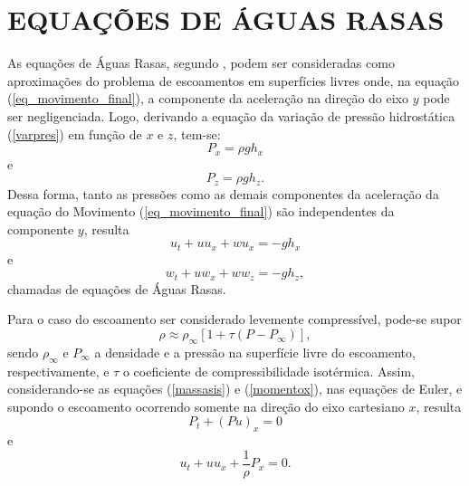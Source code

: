\section{EQUAÇÕES DE ÁGUAS RASAS} \label{aguasrasas}

As equações de Águas Rasas, segundo , podem ser consideradas como aproximações do problema de escoamentos em superfícies livres onde, na equação (\ref{eq_movimento_final}), a componente da aceleração na direção do eixo $y$ pode ser negligenciada. Logo, derivando a equação da variação de pressão hidrostática (\ref{varpres}) em função de $x$ e $z$, tem-se:
\begin{equation*} \label{P1}
P_x= \rho g h_x
\end{equation*}
e
\begin{equation*} \label{P2}
P_z= \rho g h_z.
\end{equation*}
Dessa forma, tanto as pressões como as demais componentes da aceleração da equação do Movimento (\ref{eq_movimento_final}) são independentes da componente $y$, resulta
\begin{equation} \label{AR}
u_t + uu_x + wu_x = -gh_x
\end{equation}
e
\begin{equation} \label{ARR}
w_t + uw_x + ww_z = -gh_z,
\end{equation}
chamadas de equações de Águas Rasas.

Para o caso do escoamento ser considerado levemente compressível, pode-se supor
\begin{equation*}
\rho \approx \rho_\infty \left[1+ \tau (P - P_\infty)\right],
\end{equation*}
sendo $\rho_\infty$ e $P_\infty$ a densidade e a pressão na superfície livre do escoamento, respectivamente, e $\tau$ o coeficiente de compressibilidade isotérmica. Assim, considerando-se as equações (\ref{massasis}) e (\ref{momentox}), nas equações de Euler, e supondo o escoamento ocorrendo somente na direção do eixo cartesiano $x$, resulta
\begin{equation} \label{massaP}
P_t + (Pu)_x = 0
\end{equation}
e
\begin{equation} \label{movP}
u_t + uu_x + \frac{1}{\rho} P_x = 0.
\end{equation}

